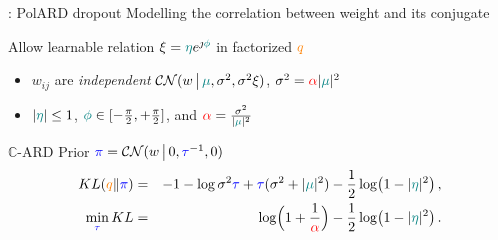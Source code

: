 \documentclass[handout]{beamer}
\newcommand{\cplx}{\mathbb{C}}
\newcommand{\iu}{{\jmath}}
\begin{document}
\begin{frame}[c]{\insertsection: PolARD dropout}
  Modelling the correlation between weight and its conjugate

  \bigskip
  Allow learnable relation $
    \xi = {\color{teal} \eta} e^{\iu {\color{teal} \phi}}
  $ in factorized ${\color{orange} q}$
  \begin{itemize}
    \item $w_{ij}$ are \emph{independent} $
      \mathcal{CN}(
        w\,\big\vert\,
        {\color{teal} \mu},
        \sigma^2,
        \sigma^2 \xi
      )
    $, $
      \sigma^2
        = {\color{red} \alpha} \lvert {\color{teal} \mu} \rvert^2
    $
    \item $
      \lvert {\color{teal} \eta} \rvert \leq 1
    $, $
      {\color{teal} \phi} \in [-\tfrac\pi2, +\tfrac\pi2]
    $, and $
      {\color{red} \alpha} = \tfrac{\sigma^2}{\lvert {\color{teal} \mu} \rvert^2}
    $
  \end{itemize}

  \pause
  \bigskip
  $\cplx$-ARD Prior $
    {\color{blue} \pi}
      = \mathcal{CN}(w\,\big\vert\, 0, {\color{blue} \tau}^{-1}, 0)
  $
  \begin{eqnarray*}
      \mathop{KL}({\color{orange} q} \| {\color{blue} \pi})
      &=& -1
        - \log \sigma^2 {\color{blue} \tau}
        + {\color{blue} \tau} (\sigma^2 + \lvert {\color{teal} \mu} \rvert^2)
        -\frac12 \log \bigl(
          1 - \lvert {\color{teal} \eta} \rvert^2
        \bigr)
      \,, \\
      \min_{{\color{blue} \tau}} KL
      &=& \log \Bigl(
          1 + \frac1{{\color{red} \alpha}}
        \Bigr)
        - \frac12 \log \bigl(
          1 - \lvert {\color{teal} \eta} \rvert^2
        \bigr)
      \,. \\
  \end{eqnarray*}
\end{frame}
\end{document}
